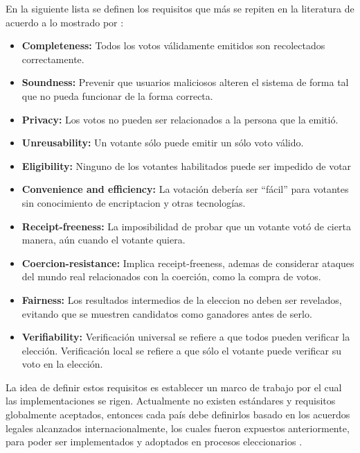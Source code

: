 En la siguiente lista se definen los requisitos que más se repiten en la literatura de acuerdo 
a lo mostrado por \cite{Foster2004,Yumeng2012}:

\begin{itemize}

	\item \textbf {Completeness:} Todos los votos válidamente
	emitidos son recolectados correctamente.

	\item \textbf {Soundness:} Prevenir que usuarios maliciosos alteren 
	el sistema de forma tal que no pueda funcionar de la forma correcta.

	\item \textbf {Privacy:} Los votos no pueden ser relacionados a la 
	persona que la emitió.

	\item \textbf {Unreusability:} Un votante sólo puede emitir un sólo voto válido.

	\item \textbf {Eligibility:} Ninguno de los votantes habilitados puede ser impedido de votar

	\item \textbf {Convenience and efficiency:} La votación debería ser “fácil” para 
	votantes sin conocimiento de encriptacion y otras tecnologías.
	
	\item \textbf {Receipt-freeness:} La imposibilidad de probar que un votante votó 
	de cierta manera, aún cuando el votante quiera.

	\item \textbf {Coercion-resistance:} Implica receipt-freeness, ademas de 
	considerar ataques del mundo real relacionados con la coerción, como la 
	compra de votos.

	\item \textbf {Fairness:} Los resultados intermedios de la 
	eleccion no deben ser revelados, evitando que se muestren 
	candidatos como ganadores antes de serlo.

	\item \textbf {Verifiability:} Verificación universal se 
	refiere a que todos pueden verificar la elección. Verificación local se 
	refiere a que sólo el votante puede verificar su voto en la elección.  

\end{itemize}

La idea de definir estos requisitos es establecer un marco de trabajo por el 
cual las implementaciones se rigen. Actualmente no existen estándares
y requisitos globalmente aceptados, entonces cada país debe
definirlos basado en los acuerdos legales alcanzados internacionalmente, 
los cuales fueron expuestos anteriormente, para poder ser implementados y adoptados
en procesos eleccionarios \cite{InternationalInstituteforDemocracyandElectoralAssistance2011}. 

